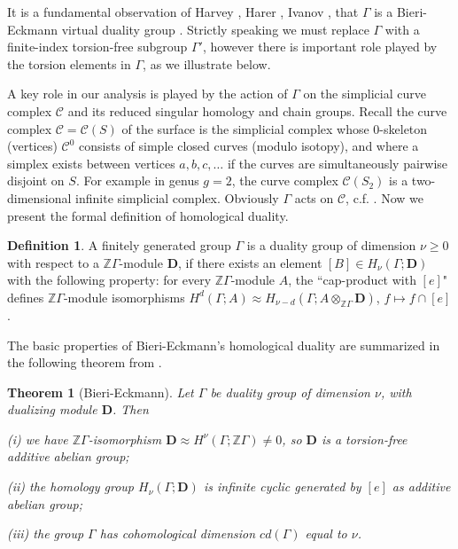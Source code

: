 \documentclass[12pt]{amsart}
\newtheorem*{thmm}{Theorem}
\theoremstyle{definition}
\newtheorem{dfn}[thm]{Definition}
\theoremstyle{remark}
\newcommand{\bZ}{\mathbb{Z}}
\newcommand{\bD}{\textbf{D}}
\newcommand{\sC}{\mathscr{C}}
\newcommand{\sT}{\mathscr{T}}
\begin{document}

It is a fundamental observation of Harvey \cite{Harvey}, Harer \cite{Harer1986}, Ivanov \cite{ivanov2015virtual}, that $\Gamma$ is a Bieri-Eckmann virtual duality group \cite{BiEck}. Strictly speaking we must replace $\Gamma$ with a finite-index torsion-free subgroup $\Gamma'$, however there is important role played by the torsion elements in $\Gamma$, as we illustrate below.

A key role in our analysis is played by the action of $\Gamma$ on the simplicial curve complex $\sC$ and its reduced singular homology and chain groups. Recall the curve complex $\sC=\sC(S)$ of the surface is the simplicial complex whose $0$-skeleton (vertices) $\sC^0$ consists of simple closed curves (modulo isotopy), and where a simplex exists between vertices $a,b,c,\ldots$ if the curves are simultaneously pairwise disjoint on $S$. For example in genus $g=2$, the curve complex $\sC(S_2)$ is a two-dimensional infinite simplicial complex. Obviously $\Gamma$ acts on $\sC$, c.f. \cite{Broaddus2012}. Now we present the formal definition of homological duality.


\begin{dfn}
\label{hd}
A finitely generated group $\Gamma$ is a duality group of dimension $\nu \geq 0$ with respect to a $\bZ \Gamma$-module $\bD$, if there exists an element $[B]\in H_\nu(\Gamma; \bD)$ with the following property: for every $\bZ \Gamma$-module $A$, the ``cap-product with $[e]$" defines $\bZ \Gamma$-module isomorphisms $H^d(\Gamma;A) \approx H_{\nu-d}(\Gamma; A \otimes_{\bZ \Gamma} \bD)$, $f\mapsto f\cap [e]$. 
\end{dfn}

The basic properties of Bieri-Eckmann's homological duality are summarized in the following theorem from \cite{BiEck}.
\begin{thmm}[Bieri-Eckmann]\label{dual1}
Let $\Gamma$ be duality group of dimension $\nu$, with dualizing module $\bD$. Then 

(i) we have $\bZ \Gamma$-isomorphism $\bD \approx H^\nu(\Gamma;\bZ \Gamma) \neq 0$, so $\bD$ is a torsion-free additive abelian group;


(ii) the homology group $H_\nu (\Gamma; \bD)$ is infinite cyclic generated by $[e]$ as additive abelian group; 

(iii) the group $\Gamma$ has cohomological dimension $cd(\Gamma)$ equal to $\nu$.
\end{thmm}
\end{document}
